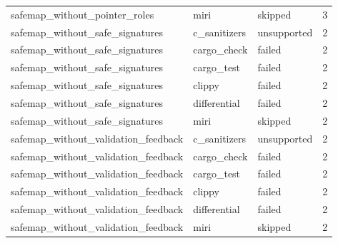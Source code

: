 \begin{table}[t]
\begin{tabular}{lllr}
safemap\_without\_pointer\_roles & miri & skipped & 3 \\
safemap\_without\_safe\_signatures & c\_sanitizers & unsupported & 2 \\
safemap\_without\_safe\_signatures & cargo\_check & failed & 2 \\
safemap\_without\_safe\_signatures & cargo\_test & failed & 2 \\
safemap\_without\_safe\_signatures & clippy & failed & 2 \\
safemap\_without\_safe\_signatures & differential & failed & 2 \\
safemap\_without\_safe\_signatures & miri & skipped & 2 \\
safemap\_without\_validation\_feedback & c\_sanitizers & unsupported & 2 \\
safemap\_without\_validation\_feedback & cargo\_check & failed & 2 \\
safemap\_without\_validation\_feedback & cargo\_test & failed & 2 \\
safemap\_without\_validation\_feedback & clippy & failed & 2 \\
safemap\_without\_validation\_feedback & differential & failed & 2 \\
safemap\_without\_validation\_feedback & miri & skipped & 2 \\
\hline
\end{tabular}
\end{table}
